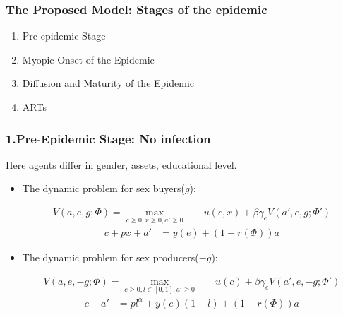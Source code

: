 \documentclass{beamer}
\begin{document}
\begin{frame}
\frametitle{The Proposed Model: Stages of the epidemic}
\Large{\begin{enumerate}
\item Pre-epidemic Stage
\item Myopic Onset of the Epidemic
\item Diffusion and Maturity of the Epidemic
\item ARTs
\end{enumerate}}
\end{frame}

\begin{frame}
\frametitle{1.Pre-Epidemic Stage: No infection}
Here agents differ in gender, assets, educational level.
\begin{itemize}
\item The dynamic problem for sex buyers($g$):

\begin{align*}
V(a,e,g;\Phi) = \max_{c\geq 0,x \geq 0,a' \geq 0} \quad &  u(c,x) + \beta \gamma_e V(a',e,g;\Phi') 
\end{align*}
\begin{align*}
c+ px +a'&= y(e) + (1+r(\Phi))a 
\end{align*}

\item The dynamic problem for sex producers($-g$):

\begin{align*}
V(a,e,-g;\Phi) = \max_{c \geq 0,l \in [0,1],a'\geq 0} \quad &  u(c) + \beta \gamma_e V(a',e,-g;\Phi') 
\end{align*}
\begin{align*}
c +a'&= pl^{\alpha} + y(e)(1-l) + (1+r(\Phi))a  
\end{align*}

\end{itemize}
\end{frame}
\end{document}
